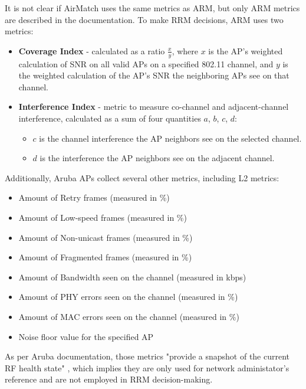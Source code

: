 It is not clear if AirMatch uses the same metrics as ARM, but only ARM metrics are described in the documentation.
To make RRM decisions, ARM uses two metrics:
\begin{itemize}
    \item \textbf{Coverage Index} - calculated as a ratio $\frac{x}{y}$, where $x$ is the AP's weighted calculation of SNR on all valid APs on a specified 802.11 channel, and $y$ is the weighted calculation of the AP's SNR the neighboring APs see on that channel.
    \item \textbf{Interference Index} - metric to measure co-channel and adjacent-channel interference, calculated as a sum of four quantities $a$, $b$, $c$, $d$:
    \begin{itemize}
        \item $c$ is the channel interference the AP neighbors see on the selected channel.
        \item $d$ is the interference the AP neighbors see on the adjacent channel.
    \end{itemize}
\end{itemize}
Additionally, Aruba APs collect several other metrics, including L2 metrics:

\begin{itemize}
    \item Amount of Retry frames (measured in \%)
    \item Amount of Low-speed frames (measured in \%)
    \item Amount of Non-unicast frames (measured in \%)
    \item Amount of Fragmented frames (measured in \%)
    \item Amount of Bandwidth seen on the channel (measured in kbps)
    \item Amount of PHY errors seen on the channel (measured in \%)
    \item Amount of MAC errors seen on the channel (measured in \%)
    \item Noise floor value for the specified AP
\end{itemize}

As per Aruba documentation, those metrics "provide a snapshot of the current RF health state" \cite{ARMMetrics}, which implies they are only used for network administator's reference and are not employed in RRM decision-making.

